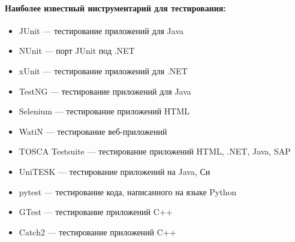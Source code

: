 \paragraph{Наиболее известный инструментарий для тестирования:}\label{par:testing-tools}
\begin{itemize}
    \item JUnit --- тестирование приложений для Java
    \item NUnit --- порт JUnit под .NET %
    \item xUnit --- тестирование приложений для .NET %
    \item TestNG --- тестирование приложений для Java
    \item Selenium --- тестирование приложений HTML
    \item WatiN --- тестирование веб-приложений
    \item TOSCA Testsuite --- тестирование приложений HTML, .NET, Java, SAP %
    \item UniTESK --- тестирование приложений на Java, Си
    \item pytest --- тестирование кода, написанного на языке Python
    \item GTest --- тестирование приложений C++
    \item Catch2 --- тестирование приложений C++
\end{itemize}
